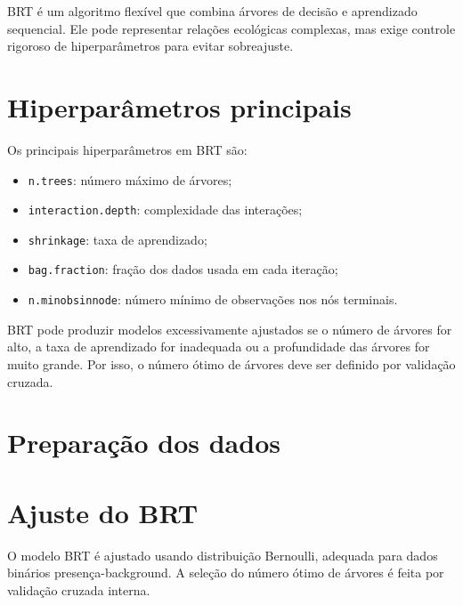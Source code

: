 \documentclass{ueap-sdm}
\begin{document}
\begin{conceito}[title={\faBook\quad BRT em SDM}]
	BRT é um algoritmo flexível que combina árvores de decisão e aprendizado sequencial. Ele pode representar relações ecológicas complexas, mas exige controle rigoroso de hiperparâmetros para evitar sobreajuste.
\end{conceito}

\section{Hiperparâmetros principais}

Os principais hiperparâmetros em BRT são:

\begin{itemize}
	\item \texttt{n.trees}: número máximo de árvores;
	\item \texttt{interaction.depth}: complexidade das interações;
	\item \texttt{shrinkage}: taxa de aprendizado;
	\item \texttt{bag.fraction}: fração dos dados usada em cada iteração;
	\item \texttt{n.minobsinnode}: número mínimo de observações nos nós terminais.
\end{itemize}

\begin{atencao}[title={\faExclamationTriangle\quad BRT e sobreajuste}]
	BRT pode produzir modelos excessivamente ajustados se o número de árvores for alto, a taxa de aprendizado for inadequada ou a profundidade das árvores for muito grande. Por isso, o número ótimo de árvores deve ser definido por validação cruzada.
\end{atencao}

\section{Preparação dos dados}



\section{Ajuste do BRT}

O modelo BRT é ajustado usando distribuição Bernoulli, adequada para dados binários presença-background. A seleção do número ótimo de árvores é feita por validação cruzada interna.
\end{document}
